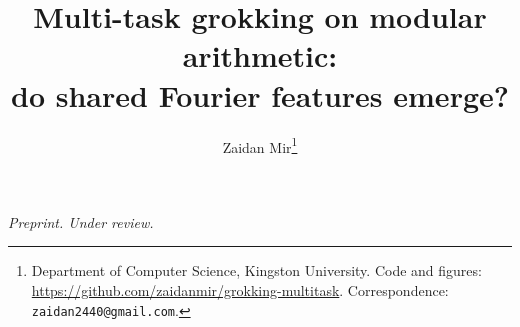 \documentclass[10pt]{article}
\title{\textbf{Multi-task grokking on modular arithmetic:\\
do shared Fourier features emerge?}}
\author{Zaidan Mir\thanks{Department of Computer Science, Kingston University.
Code and figures: \url{https://github.com/zaidanmir/grokking-multitask}.
Correspondence: \texttt{zaidan2440@gmail.com}.}}
\date{}
\begin{document}
\maketitle

\begin{center}
\textit{Preprint. Under review.}
\end{center}





















\end{document}
